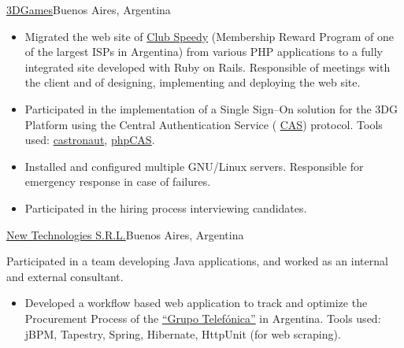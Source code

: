 \documentclass[11pt,a4paper]{moderncv}
\newcommand\weblink[2] {{\color{href} \href{#1}{#2}}}
\begin{document}
%
{\weblink{http://www.3dgames.com.ar}{3DGames}}{Buenos Aires, Argentina}{}{%
\begin{itemize}
  \item Migrated the web site of \weblink{http://club.speedy.com.ar}{Club
    Speedy} (Membership Reward Program of one of the largest ISPs in Argentina)
    from various PHP applications to a fully integrated site developed with
    Ruby on Rails. Responsible of meetings with the client and of designing,
    implementing and deploying the web site.
  \item Participated in the implementation of a Single Sign--On solution for
    the 3DG Platform using the Central Authentication Service
    (\weblink{http://en.wikipedia.org/wiki/Central_Authentication_Service}{CAS})
    protocol. Tools used:
    \weblink{https://github.com/relevance/castronaut}{castronaut},
    \weblink{https://wiki.jasig.org/display/CASC/phpCAS}{phpCAS}.
  \item Installed and configured multiple GNU/Linux servers. Responsible for
    emergency response in case of failures.
  \item Participated in the hiring process interviewing candidates.
\end{itemize}
}
%
{\weblink{http://www.newtechnologies.com.ar}{New Technologies S.R.L.}}{Buenos
Aires, Argentina}{}{%
Participated in a team developing Java applications, and
worked as an internal and external consultant.
\begin{itemize}
  \item Developed a workflow based web application to track and optimize the
    Procurement Process of the \weblink{http://www.telefonica.com/}{``Grupo
    Telefónica''} in Argentina.  Tools used: jBPM, Tapestry, Spring, Hibernate,
    HttpUnit (for web scraping).
\end{itemize}
}

\end{document}

